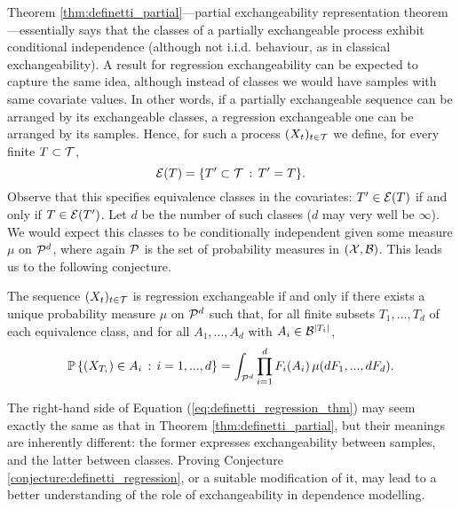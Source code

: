 Theorem \ref{thm:definetti_partial}---partial exchangeability representation theorem---essentially says that the classes of a partially exchangeable process exhibit conditional independence (although not i.i.d. behaviour, as in classical exchangeability). A result for regression exchangeability can be expected to capture the same idea, although instead of classes we would have samples with same covariate values. In other words, if a partially exchangeable sequence can be arranged by its exchangeable classes, a regression exchangeable one can be arranged by its samples. Hence, for such a process $(X_t)_{t \in \mathcal{T}}$ we define, for every finite $T \subset \mathcal{T}$,
\begin{equation*}
	\mathcal{E} (T) = \{ T' \subset \mathcal{T} \, : \, T' = T \}.
\end{equation*}
Observe that this specifies equivalence classes in the covariates: $T' \in \mathcal{E} (T)$ if and only if $T \in \mathcal{E} (T')$. Let $d$ be the number of such classes ($d$ may very well be $\infty$). We would expect this classes to be conditionally independent given some measure $\mu$ on $\mathcal{P}^d$, where again $\mathcal{P}$ is the set of probability measures in $(\mathcal{X}, \mathcal{B})$. This leads us to the following conjecture.

\begin{conjecture} \label{conjecture:definetti_regression}
	The sequence $(X_t)_{t \in \mathcal{T}}$ is regression exchangeable if and only if there exists a unique probability measure $\mu$ on $\mathcal{P}^d$ such that, for all finite subsets $T_1, ..., T_d$ of each equivalence class, and for all $A_1, ..., A_d$ with $A_i \in \mathcal{B}^{|T_i|}$,
	\begin{equation} \label{eq:definetti_regression_thm}
		\mathbb{P} \left\{ (X_{T_i}) \in A_i \, : \, i=1, ..., d  \right\} = \int_{\mathcal{P}^d}  \prod_{i=1}^d F_i(A_i) \, \mu(dF_1, ..., dF_d).
	\end{equation}
\end{conjecture}

The right-hand side of Equation (\ref{eq:definetti_regression_thm}) may seem exactly the same as that in Theorem \ref{thm:definetti_partial}, but their meanings are inherently different: the former expresses exchangeability between samples, and the latter between classes. Proving Conjecture \ref{conjecture:definetti_regression}, or a suitable modification of it, may lead to a better understanding of the role of exchangeability in dependence modelling.

























